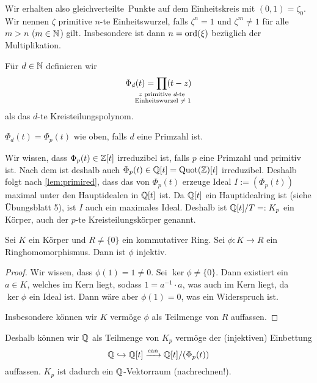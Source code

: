 \documentclass[12pt,a4paper]{scrartcl}
\begin{document}

Wir erhalten also \glqq gleichverteilte\grqq\ Punkte auf dem Einheitskreis mit $(0,1) = \zeta_0$. Wir nennen $\zeta$ primitive $n$-te Einheitswurzel, falls $\zeta^n = 1$ und $\zeta^m \neq 1$ für alle $m > n$ ($m \in \mathbb N$) gilt. Insbesondere ist dann $n = \operatorname{ord} (\xi)$ bezüglich der Multiplikation.

\begin{defi}
	Für $d \in \mathbb N$ definieren wir 
	\begin{equation*}
		\Phi_d(t) = \prod_{\mathclap{\substack{\text{$z$ primitive $d$-te}\\\text{ Einheitswurzel $\neq 1$}}}} (t - z)
	\end{equation*}
	als das $d$-te Kreisteilungspolynom.
\end{defi}

\begin{bem}
	$\Phi_d(t) = \Phi_p(t)$ wie oben, falls $d$ eine Primzahl ist. 
\end{bem}

Wir wissen, dass $\Phi_p(t) \in \mathbb Z[t]$ irreduzibel ist, falls $p$ eine Primzahl und primitiv ist. Nach dem  ist deshalb auch $\Phi_p(t) \in \mathbb Q[t] = \operatorname{Quot}(\mathbb Z)[t]$ irreduzibel. Deshalb folgt nach \cref{lem:primired}, dass das von $\Phi_p(t)$ erzeuge Ideal $I := \left( \Phi_p(t)\right) $ maximal unter den Hauptidealen in $\mathbb Q[t]$ ist. Da $\mathbb Q[t]$ ein Hauptidealring ist (siehe Übungsblatt 5), ist $I$ auch ein maximales Ideal. Deshalb ist $\mathbb Q[t] / T =: K_p $ ein Körper, auch der $p$-te Kreisteilungskörper genannt.

\begin{lem} \label{lem:koerhomoinj}
	Sei $K$ ein Körper und $R \neq \{0\}$ ein kommutativer Ring. Sei $\phi: K \to R$ ein Ringhomomorphismus. Dann ist $\phi$ injektiv.
\end{lem}

\begin{proof}
	Wir wissen, dass $\phi (1) = 1 \neq 0$. Sei $\ker \phi \neq \{0\}$. Dann existiert ein $a \in K$, welches im Kern liegt, sodass $1 = a^{-1}\cdot a$, was auch im Kern liegt, da $\ker \phi$ ein Ideal ist. Dann wäre aber $\phi(1) = 0$, was ein Widerspruch ist.
	
	Insbesondere können wir $K$ vermöge $\phi$ als Teilmenge von $R$ auffassen.  
\end{proof}

Deshalb können wir $\mathbb Q$ als Teilmenge von $K_p$ vermöge der (injektiven) Einbettung \[\mathbb Q \hookrightarrow \mathbb Q[t] \xrightarrow{\operatorname{can}} \mathbb Q[t]/(\Phi_p(t))\] auffassen. $K_p$ ist dadurch ein $\mathbb Q$-Vektorraum (nachrechnen!).
\end{document}
